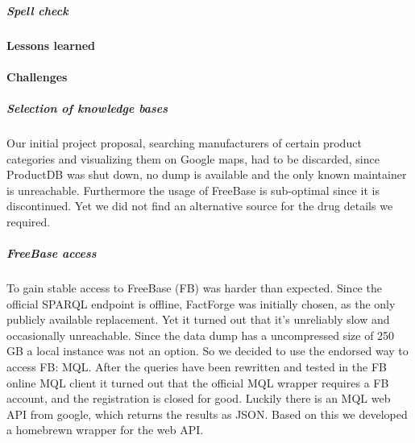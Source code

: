 \documentclass[11pt,titlepage,oneside,openany]{book}
\begin{document}
\subparagraph{Spell check}
\label{drug_spellcheck}

\paragraph{Lessons learned}
\label{cha:lessons}




\paragraph{Challenges}
\label{challenges}

\subparagraph{Selection of knowledge bases} Our initial project proposal, searching manufacturers of certain product categories and visualizing them on Google maps, had to be discarded, since ProductDB was shut down, no dump is available and the only known maintainer is unreachable. Furthermore the usage of FreeBase is sub-optimal since it is discontinued. Yet we did not find an alternative source for the drug details we required. 


\subparagraph{FreeBase access}
\label{challenges}
To gain stable access to FreeBase (FB) was harder than expected. Since the official SPARQL endpoint is offline, FactForge was initially chosen, as the only publicly available replacement. Yet it turned out that it's unreliably slow and occasionally unreachable. Since the data dump has a uncompressed size of 250 GB a local instance was not an option. 
So we decided to use the endorsed way to access FB: MQL. After the queries have been rewritten and tested in the FB online MQL client it turned out that the official MQL wrapper requires a FB account, and the registration is closed for good.
Luckily there is an MQL web API from google, which returns the results as JSON. Based on this we developed a homebrewn wrapper for the web API.



\appendix

\newpage
\end{document}
